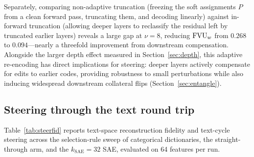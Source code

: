 Separately, comparing non-adaptive truncation (freezing the soft
assignments $P$ from a clean forward pass, truncating them, and decoding
linearly) against in-forward truncation (allowing deeper layers to
reclassify the residual left by truncated earlier layers) reveals a large
gap at $\nu{=}8$, reducing $\mathrm{FVU}_w$ from $0.268$ to $0.094$---nearly a
threefold improvement from downstream compensation. Alongside the larger
depth effect measured in Section~\ref{sec:depth}, this adaptive
re-encoding has direct implications for steering: deeper layers actively
compensate for edits to earlier codes, providing robustness to small
perturbations while also inducing widespread downstream collateral flips
(Section~\ref{sec:entangle}).

\subsection{Steering through the text round trip}
\label{sec:steertext}

Table~\ref{tab:steerfid} reports text-space reconstruction fidelity and
text-cycle steering across the selection-rule sweep of categorical
dictionaries, the straight-through arm, and the $k_{\mathrm{SAE}}{=}32$
SAE, evaluated on 64 features per run.

